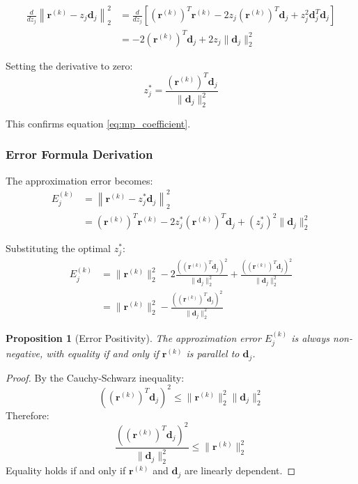 \documentclass[12pt]{article}
\newtheorem{proposition}[theorem]{Proposition}
\begin{document}
\begin{align}
    \frac{d}{dz_j} \left\|\mathbf{r}^{(k)} - z_j \mathbf{d}_j\right\|_2^2 & = \frac{d}{dz_j} \left[(\mathbf{r}^{(k)})^T \mathbf{r}^{(k)} - 2z_j (\mathbf{r}^{(k)})^T \mathbf{d}_j + z_j^2 \mathbf{d}_j^T \mathbf{d}_j\right] \\
                                                                          & = -2(\mathbf{r}^{(k)})^T \mathbf{d}_j + 2z_j \|\mathbf{d}_j\|_2^2
\end{align}

Setting the derivative to zero:
\begin{equation}
    z_j^* = \frac{(\mathbf{r}^{(k)})^T \mathbf{d}_j}{\|\mathbf{d}_j\|_2^2}
\end{equation}

This confirms equation \eqref{eq:mp_coefficient}.

\subsubsection{Error Formula Derivation}

The approximation error becomes:
\begin{align}
    E_j^{(k)} & = \left\|\mathbf{r}^{(k)} - z_j^* \mathbf{d}_j\right\|_2^2                                                          \\
              & = (\mathbf{r}^{(k)})^T \mathbf{r}^{(k)} - 2z_j^* (\mathbf{r}^{(k)})^T \mathbf{d}_j + (z_j^*)^2 \|\mathbf{d}_j\|_2^2
\end{align}

Substituting the optimal $z_j^*$:
\begin{align}
    E_j^{(k)} & = \|\mathbf{r}^{(k)}\|_2^2 - 2 \frac{((\mathbf{r}^{(k)})^T \mathbf{d}_j)^2}{\|\mathbf{d}_j\|_2^2} + \frac{((\mathbf{r}^{(k)})^T \mathbf{d}_j)^2}{\|\mathbf{d}_j\|_2^2} \\
              & = \|\mathbf{r}^{(k)}\|_2^2 - \frac{((\mathbf{r}^{(k)})^T \mathbf{d}_j)^2}{\|\mathbf{d}_j\|_2^2}
\end{align}

\begin{proposition}[Error Positivity]\label{prop:error_positivity}
    The approximation error $E_j^{(k)}$ is always non-negative, with equality if and only if $\mathbf{r}^{(k)}$ is parallel to $\mathbf{d}_j$.
\end{proposition}

\begin{proof}
    By the Cauchy-Schwarz inequality:
    \begin{equation}
        ((\mathbf{r}^{(k)})^T \mathbf{d}_j)^2 \leq \|\mathbf{r}^{(k)}\|_2^2 \|\mathbf{d}_j\|_2^2
    \end{equation}
    Therefore:
    \begin{equation}
        \frac{((\mathbf{r}^{(k)})^T \mathbf{d}_j)^2}{\|\mathbf{d}_j\|_2^2} \leq \|\mathbf{r}^{(k)}\|_2^2
    \end{equation}
    Equality holds if and only if $\mathbf{r}^{(k)}$ and $\mathbf{d}_j$ are linearly dependent.
\end{proof}
\end{document}
